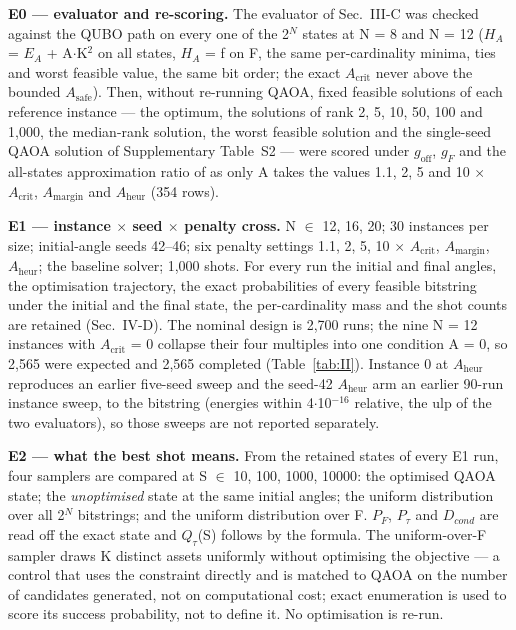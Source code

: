 \documentclass{ieeeaccess}
\begin{document}
\textbf{E0 --- evaluator and re-scoring.} The evaluator of Sec.~III-C was checked against the QUBO path on every one of the 2$^{N}$ states at N = 8 and N = 12 ($H_{A}$ = $E_{A}$ + A$\cdot$K$^{2}$ on all states, $H_{A}$ = f on F, the same per-cardinality minima, ties and worst feasible value, the same bit order; the exact $A_{\mathrm{crit}}$ never above the bounded $A_{\mathrm{safe}}$). Then, without re-running QAOA, fixed feasible solutions of each reference instance --- the optimum, the solutions of rank 2, 5, 10, 50, 100 and 1,000, the median-rank solution, the worst feasible solution and the single-seed QAOA solution of Supplementary Table~S2 --- were scored under $g_{\mathrm{off}}$, $g_{F}$ and the all-states approximation ratio of \cite{ref19} as only A takes the values 1.1, 2, 5 and 10 $\times$ $A_{\mathrm{crit}}$, $A_{\mathrm{margin}}$ and $A_{\mathrm{heur}}$ (354 rows).


\textbf{E1 --- instance $\times$ seed $\times$ penalty cross.} N $\in$ {12, 16, 20}; 30 instances per size; initial-angle seeds 42--46; six penalty settings {1.1, 2, 5, 10} $\times$ $A_{\mathrm{crit}}$, $A_{\mathrm{margin}}$, $A_{\mathrm{heur}}$; the baseline solver; 1,000 shots. For every run the initial and final angles, the optimisation trajectory, the exact probabilities of every feasible bitstring under the initial and the final state, the per-cardinality mass and the shot counts are retained (Sec.~IV-D). The nominal design is 2,700 runs; the nine N = 12 instances with $A_{\mathrm{crit}}$ = 0 collapse their four multiples into one condition A = 0, so 2,565 were expected and 2,565 completed (Table~\ref{tab:II}). Instance 0 at $A_{\mathrm{heur}}$ reproduces an earlier five-seed sweep and the seed-42 $A_{\mathrm{heur}}$ arm an earlier 90-run instance sweep, to the bitstring (energies within 4$\cdot$10$^{-16}$ relative, the ulp of the two evaluators), so those sweeps are not reported separately.


\textbf{E2 --- what the best shot means.} From the retained states of every E1 run, four samplers are compared at S $\in$ {10, 100, 1000, 10000}: the optimised QAOA state; the \textit{unoptimised} state at the same initial angles; the uniform distribution over all 2$^{N}$ bitstrings; and the uniform distribution over F. $P_{F}$, $P_{\tau}$ and $D_{cond}$ are read off the exact state and $Q_{\tau}$(S) follows by the formula. The uniform-over-F sampler draws K distinct assets uniformly without optimising the objective --- a control that uses the constraint directly and is matched to QAOA on the number of candidates generated, not on computational cost; exact enumeration is used to score its success probability, not to define it. No optimisation is re-run.
\end{document}
